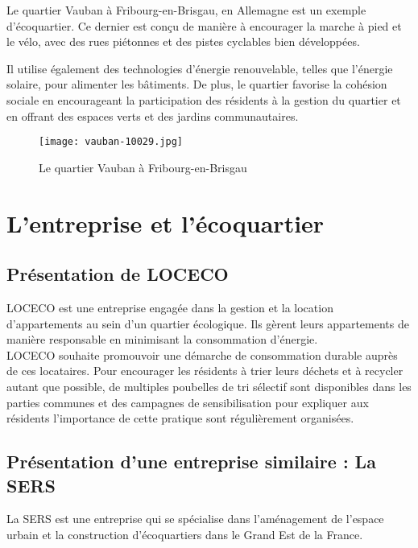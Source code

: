 Le quartier Vauban à Fribourg-en-Brisgau, en Allemagne est un exemple d'écoquartier. Ce dernier est conçu de manière à encourager la marche à pied et le vélo, avec des rues piétonnes et des pistes cyclables bien développées. 

Il utilise également des technologies d'énergie renouvelable, telles que l'énergie solaire, pour alimenter les bâtiments. De plus, le quartier favorise la cohésion sociale en encourageant la participation des résidents à la gestion du quartier et en offrant des espaces verts et des jardins communautaires.

\begin{figure}[!h]
\begin{center}
\texttt{[image: vauban-10029.jpg]}
\end{center}
\caption{Le quartier Vauban à Fribourg-en-Brisgau}
\end{figure}

\newpage

\section{L'entreprise et l'écoquartier}

\subsection{Présentation de LOCECO}

LOCECO est une entreprise engagée dans la gestion et la location d’appartements au sein d’un quartier écologique. Ils gèrent leurs appartements de manière responsable en minimisant la consommation d’énergie.\\

LOCECO souhaite promouvoir une démarche de consommation durable auprès de ces locataires. Pour encourager les résidents à trier leurs déchets et à recycler autant que possible, de multiples poubelles de tri sélectif sont disponibles dans les parties communes et des campagnes de sensibilisation pour expliquer aux résidents l'importance de cette pratique sont régulièrement organisées.

\subsection{Présentation d'une entreprise similaire : La SERS}

La SERS est une entreprise qui se spécialise dans l'aménagement de l'espace urbain et la construction d'écoquartiers dans le Grand Est de la France.\\

